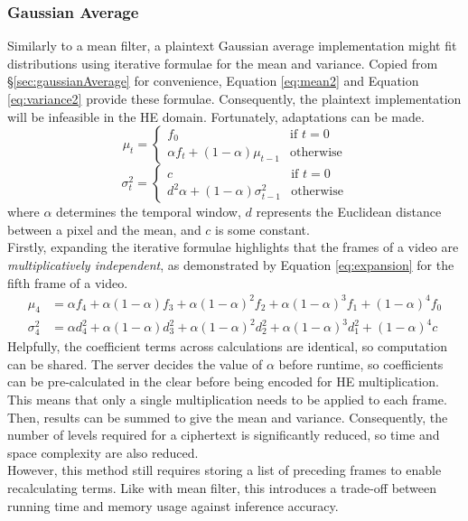 \subsubsection{Gaussian Average}
\indent \indent
Similarly to a mean filter, a plaintext Gaussian average implementation might fit distributions using iterative formulae for the mean and variance. Copied from §\ref{sec:gaussianAverage} for convenience, Equation \ref{eq:mean2} and Equation \ref{eq:variance2} provide these formulae. Consequently, the plaintext implementation will be infeasible in the HE domain. Fortunately, adaptations can be made.
\begin{equation}
    \label{eq:mean2}
    \mu_t =
    \begin{cases}
        f_0 & \text{if $t = 0$} \\
        \alpha f_t + (1 - \alpha) \mu_{t-1} & \text{otherwise}
    \end{cases}
\end{equation}
\begin{equation}
    \label{eq:variance2}
    \sigma^2_t =
    \begin{cases}
        c & \text{if $t = 0$} \\
        d^2 \alpha + (1 - \alpha) \sigma^2_{t-1} & \text{otherwise}
    \end{cases}
\end{equation}
where $\alpha$ determines the temporal window, $d$ represents the Euclidean distance between a pixel and the mean, and $c$ is some constant.
\smallskip \\ \indent
Firstly, expanding the iterative formulae highlights that the frames of a video are \textit{multiplicatively independent}, as demonstrated by Equation \ref{eq:expansion} for the fifth frame of a video.
\begin{equation}
    \label{eq:expansion}
    \begin{split}
        \mu_4 &= \alpha f_4 + \alpha (1-\alpha) f_3 + \alpha (1-\alpha)^2 f_2 + \alpha (1-\alpha)^3 f_1 + (1-\alpha)^4 f_0 \\ 
        \sigma^2_4 &= \alpha d^2_4 + \alpha (1-\alpha) d^2_3  + \alpha (1-\alpha)^2 d^2_2 + \alpha (1-\alpha)^3 d^2_1 + (1-\alpha)^4 c
    \end{split}
\end{equation}
\indent
Helpfully, the coefficient terms across calculations are identical, so computation can be shared. The server decides the value of $\alpha$ before runtime, so coefficients can be pre-calculated in the clear before being encoded for HE multiplication. This means that only a single multiplication needs to be applied to each frame. Then, results can be summed to give the mean and variance. Consequently, the number of levels required for a ciphertext is significantly reduced, so time and space complexity are also reduced.
\smallskip \\ \indent
However, this method still requires storing a list of preceding frames to enable recalculating terms. Like with mean filter, this introduces a trade-off between running time and memory usage against inference accuracy.
